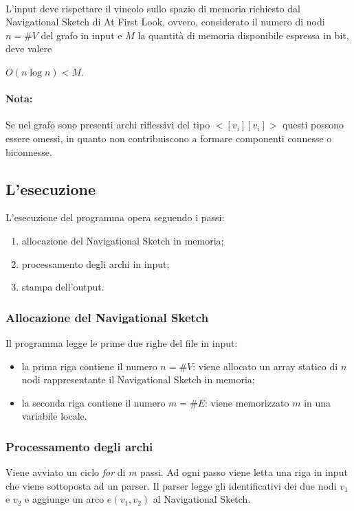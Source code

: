 \documentclass[a4paper,11pt]{report}
\begin{document}
\paragraph{}
L'input deve rispettare il vincolo sullo spazio di memoria richiesto dal Navigational Sketch di At First Look, ovvero, considerato 
il numero di nodi $n=\#V$ del grafo in input e $M$ la quantità di memoria disponibile espressa in bit, deve valere\\
\centerline{$O\left(n\log n\right)<M$.}
\paragraph{Nota:} Se nel grafo sono presenti archi riflessivi del tipo $<[v_i] [v_i]>$ questi possono essere omessi, in quanto non
contribuiscono a formare componenti connesse o 
biconnesse.
\subsection{L'esecuzione}
L'esecuzione del programma opera seguendo i passi:
\begin{enumerate}
 \item allocazione del Navigational Sketch in memoria;
 \item processamento degli archi in input;
 \item stampa dell'output. 
\end{enumerate}
\subsubsection{Allocazione del Navigational Sketch}
Il programma legge le prime due righe del file in input:
\begin{itemize}
 \item la prima riga contiene il numero $n=\#V$: viene allocato un array statico di $n$ nodi rappresentante il Navigational Sketch in
memoria;
 \item la seconda riga contiene il numero $m=\#E$: viene memorizzato $m$ in una variabile locale.
\end{itemize}
\subsubsection{Processamento degli archi}\label{Processamento degli archi}
Viene avviato un ciclo \emph{for} di $m$ passi. Ad ogni passo viene letta una riga in input che viene sottoposta ad un parser.
Il parser legge gli identificativi dei due nodi $v_1$ e $v_2$ e aggiunge un arco $e\left(v_1,v_2\right)$ al Navigational Sketch.
\end{document}
